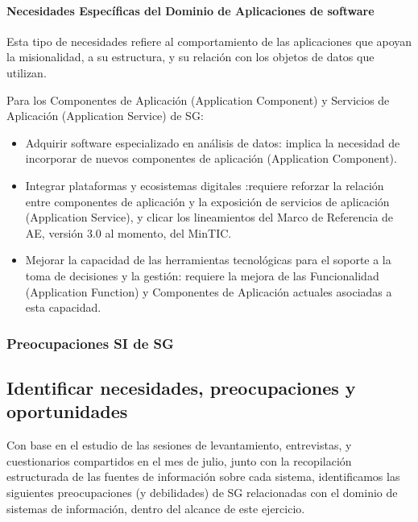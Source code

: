 \documentclass[
	a4paper, %
	12pt, %
]{include/CSSullivanBusinessReport}
\def\tightlist{}
\begin{document}
\paragraph{Necesidades Específicas del Dominio de Aplicaciones de
software}\label{sec:necesidades-especuxedficas-del-dominio-de-aplicaciones-de-software}

Esta tipo de necesidades refiere al comportamiento de las aplicaciones
que apoyan la misionalidad, a su estructura, y su relación con los
objetos de datos que utilizan.

Para los Componentes de Aplicación (Application Component) y Servicios
de Aplicación (Application Service) de SG:

\begin{itemize}
\tightlist
\item
  Adquirir software especializado en análisis de datos: implica la
  necesidad de incorporar de nuevos componentes de aplicación
  (Application Component).
\item
  Integrar plataformas y ecosistemas digitales :requiere reforzar la
  relación entre componentes de aplicación y la exposición de servicios
  de aplicación (Application Service), y clicar los lineamientos del
  Marco de Referencia de AE, versión 3.0 al momento, del MinTIC.
\item
  Mejorar la capacidad de las herramientas tecnológicas para el soporte
  a la toma de decisiones y la gestión: requiere la mejora de las
  Funcionalidad (Application Function) y Componentes de Aplicación
  actuales asociadas a esta capacidad.
\end{itemize}

\subsubsection{Preocupaciones SI de
SG}\label{sec:preocupaciones-si-de-sg}

\subsection{Identificar necesidades, preocupaciones y
oportunidades}\label{sec:identificar-necesidades-preocupaciones-y-oportunidades}

Con base en el estudio de las sesiones de levantamiento, entrevistas, y
cuestionarios compartidos en el mes de julio, junto con la recopilación
estructurada de las fuentes de información sobre cada sistema,
identificamos las siguientes preocupaciones (y debilidades) de SG
relacionadas con el dominio de sistemas de información, dentro del
alcance de este ejercicio.
\end{document}
